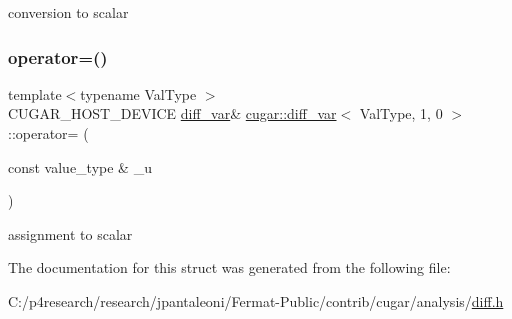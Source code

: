 conversion to scalar \mbox{\label{structcugar_1_1diff__var_3_01_val_type_00_011_00_010_01_4_a83d3b5f44b1feb4d68a89e8248638b4c}} 
\subsubsection{\texorpdfstring{operator=()}{operator=()}}
{\footnotesize\ttfamily template$<$typename Val\+Type $>$ \\
C\+U\+G\+A\+R\+\_\+\+H\+O\+S\+T\+\_\+\+D\+E\+V\+I\+CE \hyperlink{structcugar_1_1diff__var}{diff\+\_\+var}\& \hyperlink{structcugar_1_1diff__var}{cugar\+::diff\+\_\+var}$<$ Val\+Type, 1, 0 $>$\+::operator= (\begin{DoxyParamCaption}\item[{const value\+\_\+type \&}]{\+\_\+u }\end{DoxyParamCaption})\hspace{0.3cm}{\ttfamily [inline]}}

assignment to scalar 

The documentation for this struct was generated from the following file\+:\begin{DoxyCompactItemize}
\item 
C\+:/p4research/research/jpantaleoni/\+Fermat-\/\+Public/contrib/cugar/analysis/\hyperlink{diff_8h}{diff.\+h}\end{DoxyCompactItemize}
